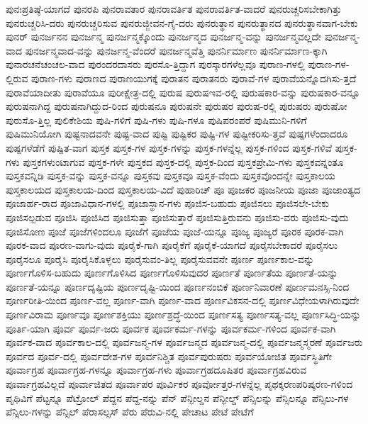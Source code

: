 {ಪುನಃಪ್ರತಿಷ್ಠೆ-ಯಾಗದೆ
ಪುನರಪಿ
ಪುನರಾವತಾರ
ಪುನರಾವರ್ತಿತ
ಪುನರಾವರ್ತಿತ-ವಾದರೆ
ಪುನರುಚ್ಚರಿಸಬೇಕಾಗಿತ್ತು
ಪುನರುಚ್ಚರಿಸಿ-ದರು
ಪುನರುಚ್ಚರಿಸುವ
ಪುನರುಜ್ಜೀವನ-ಗೈ-ದರು
ಪುನರುತ್ಥಾನ
ಪುನರುತ್ಥಾನದ
ಪುನರುತ್ಥಾನವಾಗ-ಬೇಕು
ಪುನರ್
ಪುನರ್ಜನನ
ಪುನರ್ಜನ್ಮ
ಪುನರ್ಜನ್ಮಕ್ಕೊಂದು
ಪುನರ್ಜನ್ಮದ
ಪುನರ್ಜನ್ಮ-ವನ್ನು
ಪುನರ್ಜನ್ಮವಲ್ಲದೇ
ಪುನರ್ಜನ್ಮ-ವಾದ
ಪುನರ್ಜನ್ಮವಾದ-ವನ್ನು
ಪುನರ್ಜನ್ಮ-ವೆಂದರೆ
ಪುನರ್ಜನ್ಮವೆತ್ತಿ
ಪುನರ್ನಿರ್ಮಾಣ
ಪುನರ್ನಿರ್ಮಾಣ-ಕ್ಕಾಗಿ
ಪುನಾರಚನೆಚಂಚಲ-ವಾದ
ಪುರಂದರದಾಸರು
ಪುರಸೊ-ತ್ತಿದ್ದಾಗ
ಪುರಸ್ಕಾರಗಳೆಲ್ಲವೂ
ಪುರಾಣ-ಗಳಲ್ಲಿ
ಪುರಾಣ-ಗಳ-ಲ್ಲಿರುವ
ಪುರಾಣ-ಗಳು
ಪುರಾಣದ
ಪುರಾಣಯುಗಕ್ಕೆ
ಪುರಾತನ
ಪುರಾತನರು
ಪುರಾವೆ-ಗಳ
ಪುರಾವೆಯನ್ನೊದಗಿಸು-ತ್ತದೆ
ಪುರಾವೆಯಾದೀತು
ಪುರಾವೆಯೂ
ಪುರೀಕ್ಷೇತ್ರ-ದಲ್ಲಿ
ಪುರುಷ
ಪುರುಷಇವ-ರಲ್ಲಿ
ಪುರುಷಕಾರ-ವನ್ನು
ಪುರುಷಕಾರ-ವನ್ನೂ
ಪುರುಷನಾಗಿದ್ದ
ಪುರುಷನಾಗಿದ್ದುದ-ರಿಂದ
ಪುರುಷನೂ
ಪುರುಷನೇ
ಪುರುಷರ
ಪುರುಷ-ರಲ್ಲಿ
ಪುರುಷರು
ಪುರುಷೋ
ಪುರುಸೊ-ತ್ತಿಲ್ಲ
ಪುಲಿಕೇಶಿಯ
ಪುಷಿ-ಗಳಿಗೆ
ಪುಷಿ-ಗಳು
ಪುಷಿ-ಗಳೂ
ಪುಷಿಪರಂಪರೆ
ಪುಷಿಮುನಿ-ಗಳಿಗೆ
ಪುಷಿಮುನಿಯೋಗಿ
ಪುಷ್ಟನಾದವನೇ
ಪುಷ್ಟ-ವಾದ
ಪುಷ್ಟಿ
ಪುಷ್ಟಿಕರ
ಪುಷ್ಟಿ-ಗಳ
ಪುಷ್ಟೀಕರಿಸು-ತ್ತವೆ
ಪುಷ್ಪಗಳೆಂದಾದರೂ
ಪುಷ್ಪಗಳೆಡೆಗೆ
ಪುಷ್ಪಿತ-ವಾಗ
ಪುಸ್ತಕ
ಪುಸ್ತಕ-ಗಳ
ಪುಸ್ತಕ-ಗಳನ್ನು
ಪುಸ್ತಕ-ಗಳನ್ನೆಲ್ಲ
ಪುಸ್ತಕ-ಗಳಿಂದ
ಪುಸ್ತಕ-ಗಳಿವೆ
ಪುಸ್ತಕ-ಗಳು
ಪುಸ್ತಕಗಳುಂಟಾಗುವ
ಪುಸ್ತಕ-ಗಳೇ
ಪುಸ್ತಕದ
ಪುಸ್ತಕ-ದಲ್ಲಿ
ಪುಸ್ತಕ-ದಿಂದ
ಪುಸ್ತಕಪ್ರೇಮಿ-ಗಳು
ಪುಸ್ತಕವನ್ನಂತೂ
ಪುಸ್ತಕವನ್ನಿಡಿ
ಪುಸ್ತಕ-ವನ್ನು
ಪುಸ್ತಕ-ವನ್ನೂ
ಪುಸ್ತಕವು
ಪುಸ್ತಕವೂ
ಪುಸ್ತಕ-ವೆಂದು
ಪುಸ್ತಕವೊಂದನ್ನೇ
ಪುಸ್ತಕಾಲಯ
ಪುಸ್ತಕಾಲಯದ
ಪುಸ್ತಕಾಲಯ-ದಿಂದ
ಪುಸ್ತಕಾಲಯ-ವಿದೆ
ಪುಹಾರಿಚ್
ಪೂ
ಪೂಜಕರ
ಪೂಜನೀಯ
ಪೂಜಾ
ಪೂಜಾಂತ್ಯದ
ಪೂಜಾರ್ಹ-ರಾದ
ಪೂಜಾವಿಧಾನ-ಗಳಲ್ಲಿ
ಪೂಜಾಸ್ಥಾನ-ಗಳು
ಪೂಜಿಸ-ಬಹುದು
ಪೂಜಿಸಲು
ಪೂಜಿಸಲೇ-ಬೇಕು
ಪೂಜಿಸಲ್ಪಡುವ
ಪೂಜಿಸಿ
ಪೂಜಿಸಿದ
ಪೂಜಿಸುತ್ತಾ
ಪೂಜಿಸುತ್ತಾರೆ
ಪೂಜಿಸುತ್ತಿರುವನು
ಪೂಜಿಸು-ವರು
ಪೂಜಿಸು-ವುದು
ಪೂಜಿಸೋಣ
ಪೂಜೆ
ಪೂಜೆಗಳಿಂದಲೂ
ಪೂಜೆಗೆ
ಪೂಜೆಯ
ಪೂಜೆ-ಯನ್ನೂ
ಪೂಜ್ಯ
ಪೂಜ್ಯರೆ
ಪೂರಕ
ಪೂರಕ-ವಾಗಿ
ಪೂರಕ-ವಾದ
ಪೂರಣ-ವಾಗು-ವುದು
ಪೂರೈಕೆ-ಗಾಗಿ
ಪೂರೈಕೆಗೆ
ಪೂರೈಕೆ-ಯಾಗದೆ
ಪೂರೈಸಬೇಕಾದರೆ
ಪೂರೈಸಲು
ಪೂರೈಸಲೂ
ಪೂರೈಸಿ
ಪೂರೈಸಿಕೊಳ್ಳಲು
ಪೂರೈಸುವಂ-ತಿಲ್ಲ
ಪೂರೈಸುವವನೇ
ಪೂರ್ಣ
ಪೂರ್ಣಕಾಲ-ವನ್ನು
ಪೂರ್ಣಗೊಳಿಸ-ಬಹುದು
ಪೂರ್ಣಗೊಳಿಸಿದ
ಪೂರ್ಣಗೊಳಿಸುವುದರ
ಪೂರ್ಣತೆ
ಪೂರ್ಣತೆಯ
ಪೂರ್ಣತೆ-ಯನ್ನು
ಪೂರ್ಣತೆ-ಯನ್ನೂ
ಪೂರ್ಣದೃಷ್ಟಿಯ
ಪೂರ್ಣದೃಷ್ಟಿ-ಯಿಂದ
ಪೂರ್ಣನಂಬಿಕೆ
ಪೂರ್ಣನಿವಾರಣೆ
ಪೂರ್ಣಮನಸ್ಸಿ-ನಿಂದ
ಪೂರ್ಣರೀತಿ-ಯಿಂದ
ಪೂರ್ಣ-ವಲ್ಲ
ಪೂರ್ಣ-ವಾಗಿ
ಪೂರ್ಣ-ವಾದ
ಪೂರ್ಣವಿಕಸನ-ದಲ್ಲಿ
ಪೂರ್ಣವಿಧೇಯಳಾಗಿರುವುದೇ
ಪೂರ್ಣವಿರಾಮ
ಪೂರ್ಣವೂ
ಪೂರ್ಣಶಕ್ತಿಯು
ಪೂರ್ಣಶ್ರದ್ಧೆ-ಯಿಂದ
ಪೂರ್ಣಸತ್ಯ
ಪೂರ್ಣಸತ್ಯ-ವಲ್ಲ
ಪೂರ್ಣಸಿದ್ಧಿ-ಯನ್ನು
ಪೂರ್ತಿ-ಯಾಗಿ
ಪೂರ್ವ
ಪೂರ್ವ-ಜರು
ಪೂರ್ವಕ
ಪೂರ್ವಕರ್ಮ-ಗಳನ್ನು
ಪೂರ್ವಕರ್ಮ-ಗಳಿಂದ
ಪೂರ್ವಕ-ವಾಗಿ
ಪೂರ್ವಕ-ವಾದ
ಪೂರ್ವಕಾಲ-ದಲ್ಲಿ
ಪೂರ್ವಜನ್ಮ-ಗಳ
ಪೂರ್ವಜನ್ಮದ
ಪೂರ್ವಜನ್ಮ-ದಲ್ಲಿ
ಪೂರ್ವಜನ್ಮಸ್ಮರಣೆ
ಪೂರ್ವಜರು
ಪೂರ್ವದ
ಪೂರ್ವ-ದಲ್ಲಿ
ಪೂರ್ವದೇಶ-ಗಳ
ಪೂರ್ವನಿಶ್ಚಿತ
ಪೂರ್ವಪುರುಷರು
ಪೂರ್ವಯೋಜಿತ
ಪೂರ್ವಸ್ಥಿತಿಗೇ
ಪೂರ್ವಾಗ್ರಹ
ಪೂರ್ವಾಗ್ರಹ-ಗಳನ್ನೂ
ಪೂರ್ವಾಗ್ರಹ-ಗಳು
ಪೂರ್ವಾಗ್ರಹದೂಷಿತರ
ಪೂರ್ವಾಗ್ರಹವಿರುವ
ಪೂರ್ವಾಗ್ರಹವಿಲ್ಲದೆ
ಪೂರ್ವಾಜಿತದ
ಪೂರ್ವಾಪರ
ಪೂರ್ವಿಕರ
ಪೂರ್ವೋತ್ತರ-ಗಳನ್ನೆಲ್ಲ
ಪೃಥಕ್ಕರಣಪರಿಷ್ಕರಣ-ಗಳಿಂದ
ಪೃಥಿವಿಗೆ
ಪೆಟ್ಟನ್ನೂ
ಪೆಟ್ರೋಲ್
ಪೆದ್ದನ
ಪೆದ್ದ-ನನ್ನು
ಪೆನ್
ಪೆನ್ಫೀಲ್ಡನ
ಪೆನ್ಫೀಲ್ಡ್
ಪೆನ್ಸಿಲನ್ನು
ಪೆನ್ಸಿಲನ್ನೂ
ಪೆನ್ಸಿಲು-ಗಳ
ಪೆನ್ಸಿಲು-ಗಳನ್ನು
ಪೆನ್ಸಿಲ್
ಪೆರಾಸಲ್ಸಸ್
ಪೆರು
ಪೆರುವಿ-ನಲ್ಲಿ
ಪೇಚಾಟ
ಪೇಟೆ
ಪೇಟೆಗೆ
}
